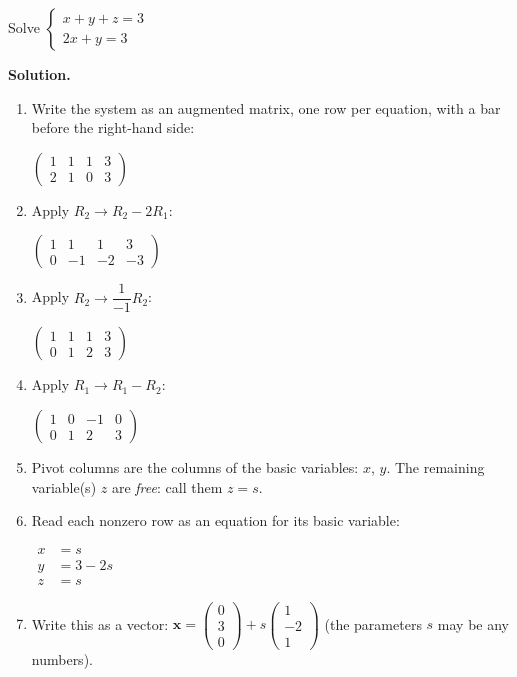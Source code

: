 \documentclass[11pt]{article}
\begin{document}
\begin{tcolorbox}[breakable,colback=white,colframe=ink!60,title={\bfseries Example 3 \textperiodcentered\ A system with infinitely many solutions}]Solve $\begin{cases}x+y+z=3\\ 2x+y=3\end{cases}$
\par\smallskip
\textbf{Solution.} \begin{enumerate}[leftmargin=1.6em,itemsep=1pt,topsep=2pt,label=\arabic*.]\item Write the system as an augmented matrix, one row per equation, with a bar before the right-hand side:\par\smallskip $\displaystyle \left(\begin{array}{ccc|c}1 & 1 & 1 & 3 \\ 2 & 1 & 0 & 3\end{array}\right)$
\item Apply $R_2\to R_2-2R_1$:\par\smallskip $\displaystyle \left(\begin{array}{ccc|c}1 & 1 & 1 & 3 \\ 0 & -1 & -2 & -3\end{array}\right)$
\item Apply $R_2\to \dfrac{1}{-1} R_2$:\par\smallskip $\displaystyle \left(\begin{array}{ccc|c}1 & 1 & 1 & 3 \\ 0 & 1 & 2 & 3\end{array}\right)$
\item Apply $R_1\to R_1-R_2$:\par\smallskip $\displaystyle \left(\begin{array}{ccc|c}1 & 0 & -1 & 0 \\ 0 & 1 & 2 & 3\end{array}\right)$
\item Pivot columns are the columns of the basic variables: $x$, $y$. The remaining variable(s) $z$ are \emph{free}: call them $z=s$.
\item Read each nonzero row as an equation for its basic variable:\par\smallskip $\displaystyle\begin{aligned}x&=s\\ y&=3-2s\\ z&=s\end{aligned}$
\item Write this as a vector: $\displaystyle \mathbf x=\begin{pmatrix}0\\3\\0\end{pmatrix}+s\begin{pmatrix}1\\-2\\1\end{pmatrix}$ (the parameters $s$ may be any numbers).

\end{enumerate}
\end{tcolorbox}
\end{document}
